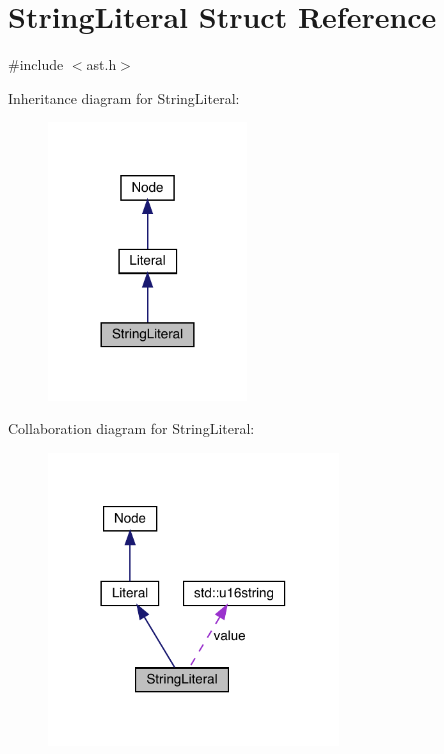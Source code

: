 \hypertarget{struct_string_literal}{}\section{String\+Literal Struct Reference}
\label{struct_string_literal}


{\ttfamily \#include $<$ast.\+h$>$}



Inheritance diagram for String\+Literal\+:\nopagebreak
\begin{figure}[H]
\begin{center}
\leavevmode
\includegraphics[width=149pt]{struct_string_literal__inherit__graph}
\end{center}
\end{figure}


Collaboration diagram for String\+Literal\+:\nopagebreak
\begin{figure}[H]
\begin{center}
\leavevmode
\includegraphics[width=218pt]{struct_string_literal__coll__graph}
\end{center}
\end{figure}

